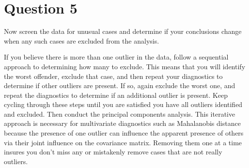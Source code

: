 \documentclass{article}\usepackage[]{graphicx}\usepackage[]{color}
\begin{document}
\section{Question 5}
Now screen the data for unusual cases and determine if your conclusions change when
any such cases are excluded from the analysis.  

If you believe there is more than one outlier in the data, follow a sequential approach to determining how many to exclude. This means that you will identify the worst offender, exclude that case, and then repeat your diagnostics to determine if other outliers are present. If so, again exclude the worst one, and repeat the diagnostics to determine if an additional outlier is present. Keep cycling through these steps until you are satisfied you have all outliers identified and excluded. Then conduct the principal components analysis. This iterative approach is necessary for multivariate diagnostics such as Mahalanobis distance because the presence of one outlier can influence the apparent presence of others via their joint influence on the covariance matrix. Removing them one at a time insures you don’t miss any or mistakenly remove cases that are not really outliers.  
\end{document}
